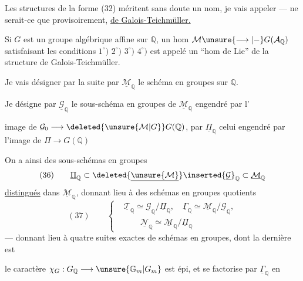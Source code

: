 Les structures de la forme (32) méritent sans doute un nom, je vais  appeler --- ne serait-ce que provisoirement, \uline{ de Galois-Teichmüller.}

Si $G$ est un groupe algébrique affine sur $\mathbb{Q}$, un hom $\mathcal{M}\unsure{\longrightarrow|{-}}G(\mathcal{A}_{\mathbb{Q}})$ satisfaisant les conditions $1^{\circ})$ $2^{\circ})$ $3^{\circ})$  $4^{\circ})$ est appelé un ``hom de Lie'' de la structure de Galois-Teichmüller.

Je vais désigner par la suite par $\underline{\mathcal{M}}_{\mathbb{Q}}$  le schéma en groupes  sur $\mathbb{Q}$. 

Je désigne par  $\underline{\mathcal{G}}_{\mathbb{Q}}$ le sous-schéma en groupes de $\underline{\mathcal{M}}_{\mathbb{Q}}$ engendré par l'


image de $\mathcal{G}_0\longrightarrow\deleted{\unsure{\mathcal{M}|G}}G(\mathbb{Q})$, par $\underline{\Pi}_{\mathbb{Q}}$ celui engendré par l'image de $\Pi\longrightarrow G(\mathbb{Q})$

On a ainsi  des sous-schémas en groupes
\[
(36)\qquad \underline{\Pi}_{\mathbb{Q}}\subset
\deleted{\underline{\unsure{\mathcal{M}}}}\inserted{\underline{\mathcal{G}}}_{\mathbb{Q}}
\subset\underline{\mathcal{M}}_{\mathbb{Q}}
\]
\uline{distingués} dans $\underline{\mathcal{M}}_{\mathbb{Q}}$, donnant lieu à des schémas en groupes quotients
\[
(37)\qquad
\left\{
\begin{aligned}
&\underline{\mathcal{T}}_{\mathbb{Q}}\simeq
\underline{\mathcal{G}}_{\mathbb{Q}}/\underline{\Pi}_{\mathbb{Q}},\quad
\underline{\Gamma}_{\mathbb{Q}}\simeq
\underline{\mathcal{M}}_{\mathbb{Q}}/\underline{\mathcal{G}}_{\mathbb{Q}},\\
&\qquad\underline{\mathcal{N}}_{\mathbb{Q}}\simeq
\underline{\mathcal{M}}_{\mathbb{Q}}/\underline{\Pi}_{\mathbb{Q}}
\end{aligned}
\right.
\]
--- donnant lieu à quatre suites exactes de schémas en groupes, dont la dernière est

 le caractère $\chi_G:G_{\mathbb{Q}}\longrightarrow \unsure{\mathbb{G}_m|G_m}$ est épi, et se factorise par $\underline{\Gamma}_{\mathbb{Q}}$ en
